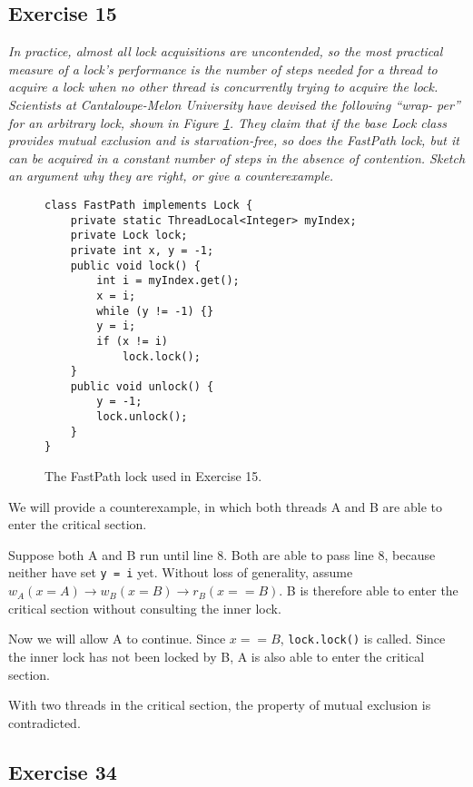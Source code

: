 \documentclass[a4paper,10pt]{article}
\begin{document}
\subsection{Exercise 15}

\emph{In practice, almost all lock acquisitions are uncontended, so the most
practical measure of a lock’s performance is the number of steps needed for a
thread to acquire a lock when no other thread is concurrently trying to acquire
the lock.
Scientists at Cantaloupe-Melon University have devised the following ``wrap-
per'' for an arbitrary lock, shown in Figure \ref{fig:fastpath}. They claim that if the base Lock class
provides mutual exclusion and is starvation-free, so does the FastPath lock, but
it can be acquired in a constant number of steps in the absence of contention.
Sketch an argument why they are right, or give a counterexample.}

\vspace{3mm}

\begin{figure}
\begin{lstlisting}
class FastPath implements Lock {
    private static ThreadLocal<Integer> myIndex;
    private Lock lock;
    private int x, y = -1;
    public void lock() {
        int i = myIndex.get();
        x = i;
        while (y != -1) {}
        y = i;
        if (x != i)
            lock.lock();
    }
    public void unlock() {
        y = -1;
        lock.unlock();
    }
}
\end{lstlisting}
\caption{The FastPath lock used in Exercise 15.}
\label{fig:fastpath}
\end{figure}

We will provide a counterexample, in which both threads A and B are able to enter
the critical section.

Suppose both A and B run until line 8. Both are able to pass line 8, because neither
have set \lstinline|y = i| yet. Without loss of generality, assume
$w_A(x = A) \rightarrow w_B(x = B) \rightarrow r_B(x == B)$. B is therefore
able to enter the critical section without consulting the inner lock.

Now we will allow A to continue. Since $x == B$, \lstinline|lock.lock()| is called.
Since the inner lock has not been locked by B, A is also able to enter the critical section.

With two threads in the critical section, the property of mutual exclusion is
contradicted.


\subsection{Exercise 34}
\end{document}
